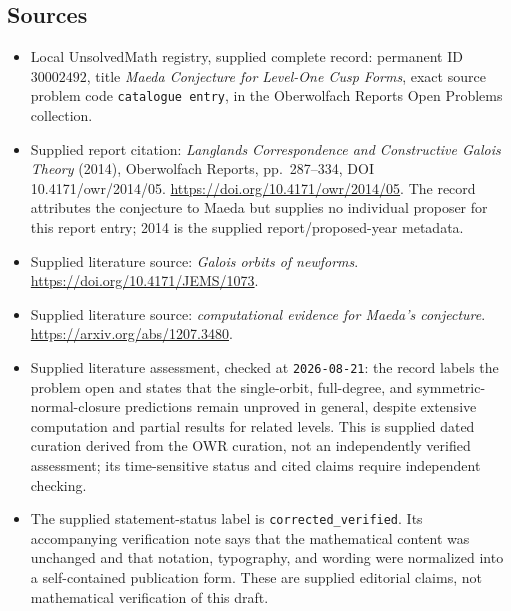 \documentclass[11pt]{article}
\begin{document}
\subsection{Sources}
\begin{itemize}
\item Local UnsolvedMath registry, supplied complete record: permanent ID \(30002492\), title \emph{Maeda Conjecture for Level-One Cusp Forms}, exact source problem code \texttt{catalogue entry}, in the Oberwolfach Reports Open Problems collection.
\item Supplied report citation: \emph{Langlands Correspondence and Constructive Galois Theory} (2014), Oberwolfach Reports, pp.\ 287--334, DOI 10.4171/owr/2014/05. \url{https://doi.org/10.4171/owr/2014/05}. The record attributes the conjecture to Maeda but supplies no individual proposer for this report entry; 2014 is the supplied report/proposed-year metadata.
\item Supplied literature source: \emph{Galois orbits of newforms}. \url{https://doi.org/10.4171/JEMS/1073}.
\item Supplied literature source: \emph{computational evidence for Maeda's conjecture}. \url{https://arxiv.org/abs/1207.3480}.
\item Supplied literature assessment, checked at \texttt{2026-08-21}: the record labels the problem open and states that the single-orbit, full-degree, and symmetric-normal-closure predictions remain unproved in general, despite extensive computation and partial results for related levels. This is supplied dated curation derived from the OWR curation, not an independently verified assessment; its time-sensitive status and cited claims require independent checking.
\item The supplied statement-status label is \texttt{corrected\_verified}. Its accompanying verification note says that the mathematical content was unchanged and that notation, typography, and wording were normalized into a self-contained publication form. These are supplied editorial claims, not mathematical verification of this draft.
\end{itemize}
\end{document}
